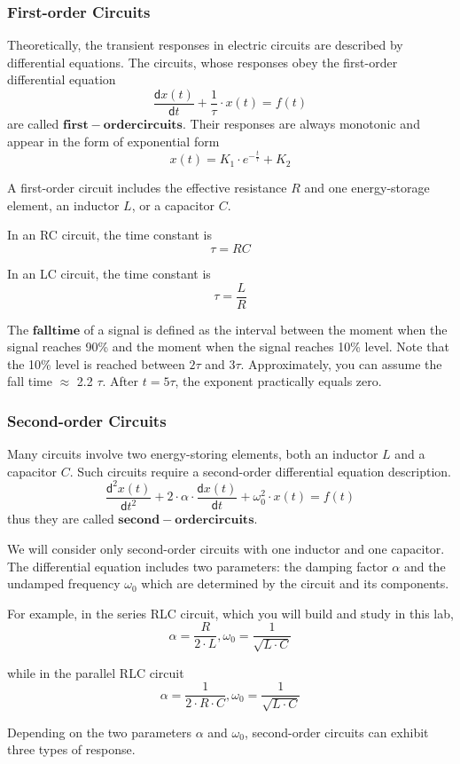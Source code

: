 \documentclass[12pt]{article}
\begin{document}
\subsubsection{First-order Circuits}
Theoretically, the transient responses in electric circuits are described by differential equations. The circuits, whose responses obey the first-order differential equation
$$\frac{\mathsf{d}x(t)}{\mathsf{d}t}+\frac{1}{\tau}\cdot x(t)=f(t)$$
are called $\mathbf{first-order circuits}$. Their responses are always monotonic and appear in the form of exponential form
$$x(t)=K_1\cdot e^{-\frac{t}{\tau}}+K_2$$
\par A first-order 	circuit includes the effective resistance $R$ and one energy-storage element, an inductor $L$, or a capacitor $C$.
\par In an RC circuit, the time constant is
$$\tau=RC$$
\par In an LC circuit, the time constant is 
$$\tau=\frac{L}{R}$$
\par The $\mathbf{fall time}$ of a signal is defined as the interval between the moment when the signal reaches 90\% and the moment when the signal reaches 10\% level. Note that the 10\% level is reached between $2\tau$ and $3\tau$. Approximately, you can assume the fall time $\approx$ 2.2 $\tau$. After $t=5\tau$, the exponent practically equals zero.
\subsubsection{Second-order Circuits}
Many circuits involve two energy-storing elements, both an inductor $L$ and a capacitor $C$. Such circuits require a second-order differential equation description.
$$\frac{\mathsf{d}^2x(t)}{\mathsf{d}t^2}+2\cdot\alpha\cdot\frac{\mathsf{d}x(t)}{\mathsf{d}t}+\omega_0^2\cdot x(t)=f(t)$$
thus they are called $\mathbf{second-order circuits}$.
\par We will consider only second-order circuits with one inductor and one capacitor. The differential equation includes two parameters: the damping factor $\alpha$ and the undamped frequency $\omega_0$ which are determined by the circuit and its components.
\par For example, in the series RLC circuit, which you will build and study in this lab,
$$\alpha=\frac{R}{2\cdot L},\omega_0=\frac{1}{\sqrt{L\cdot C}}$$
\par while in the parallel RLC circuit
$$\alpha=\frac{1}{2\cdot R\cdot C},\omega_0=\frac{1}{\sqrt{L\cdot C}}$$
\par Depending on the two parameters $\alpha$ and $\omega_0$, second-order circuits can exhibit three types of response.
\end{document}

